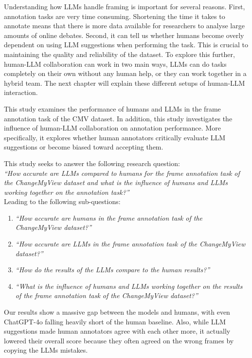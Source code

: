 \documentclass[
10pt, %
a4paper, %
oneside, %
headinclude,footinclude, %
] {book}%
\begin{document}
Understanding how LLMs handle framing is important for several reasons. First, annotation tasks are very time consuming. Shortening the time it takes to annotate means that there is more data available for researchers to analyse large amounts of online debates. Second, it can tell us whether humans become overly dependent on using LLM suggestions when performing the task. This is crucial to maintaining the quality and reliability of the dataset. To explore this further, human-LLM collaboration can work in two main ways, LLMs can do tasks completely on their own without any human help, or they can work together in a hybrid team. The next chapter will explain these different setups of human-LLM interaction.


This study examines the performance of humans and LLMs in the frame annotation task of the CMV dataset. In addition, this study investigates the influence of human-LLM collaboration on annotation performance. More specifically, it explores whether human annotators critically evaluate LLM suggestions or become biased toward accepting them.

\newpage

This study seeks to answer the following research question:\\ 
    \textit{“How accurate are LLMs compared to humans for the frame annotation task of the ChangeMyView dataset and what is the influence of humans and LLMs working together on the annotation task?”}\\




Leading to the following sub-questions:
\begin{enumerate}
    \item \textit{``How accurate are humans in the frame annotation task of the ChangeMyView dataset?''}
    \item \textit{``How accurate are LLMs in the frame annotation task of the ChangeMyView dataset?''}
    \item \textit{``How do the results of the LLMs compare to the human results?''} 
    \item \textit{``What is the influence of humans and LLMs working together on the results of the frame annotation task of the ChangeMyView dataset?''}
\end{enumerate}


Our results show a massive gap between the models and humans, with even ChatGPT-4o falling heavily short of the human baseline. Also, while LLM suggestions made human annotators agree with each other more, it actually lowered their overall score because they often agreed on the wrong frames by copying the LLMs mistakes.
\end{document}
